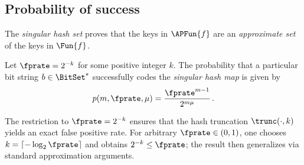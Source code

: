 \documentclass[ ../main.tex]{subfiles}
\begin{document}
\subsection{Probability of success}
\label{sec:shm-prob}

The \emph{singular hash set} proves that the keys in $\APFun{f}$ are an \emph{approximate set} of the keys in $\Fun{f}$.

\begin{theorem}
\label{thm:shm-success}
Let $\fprate = 2^{-k}$ for some positive integer $k$.
The probability that a particular bit string $b \in \BitSet^*$ successfully codes the \emph{singular hash map} is given by
\begin{equation}
    p(m,\fprate,\mu) = \frac{\fprate^{m-1}}{2^{m \mu}}\,.
\end{equation}
\end{theorem}
\begin{remark}
The restriction to $\fprate = 2^{-k}$ ensures that the hash truncation $\trunc(\cdot, k)$ yields an exact false positive rate.
For arbitrary $\fprate \in (0,1)$, one chooses $k = \lceil -\log_2 \fprate \rceil$ and obtains $2^{-k} \leq \fprate$; the result then generalizes via standard approximation arguments.
\end{remark}
\end{document}
